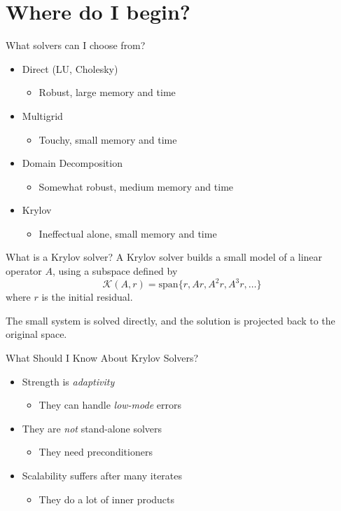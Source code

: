 \documentclass[dvipsnames]{beamer}
\begin{document}
\section{Where do I begin?}
%
\begin{frame}{What solvers can I choose from?}\Large
\begin{itemize}
  \item Direct (LU, Cholesky)
  \begin{itemize}
    \item Robust, large memory and time
  \end{itemize}
  \bigskip
  \item Multigrid
  \begin{itemize}
    \item Touchy, small memory and time
  \end{itemize}
  \bigskip
  \item Domain Decomposition
  \begin{itemize}
    \item Somewhat robust, medium memory and time
  \end{itemize}
  \bigskip
  \item Krylov
  \begin{itemize}
    \item Ineffectual alone, small memory and time
  \end{itemize}
\end{itemize}
\end{frame}
%
\begin{frame}{What is a Krylov solver?}\Large
A Krylov solver builds a small model of a linear operator $A$, using a subspace defined by
\begin{equation*}
  \mathcal{K}(A,r) = \mathrm{span}\{r, Ar, A^2r, A^3r, \ldots \}
\end{equation*}
where $r$ is the initial residual.
\bigskip

\pause
The small system is solved directly, and the solution is projected back to the original space.
\end{frame}
%
\begin{frame}{What Should I Know About Krylov Solvers?}
\LARGE
\begin{itemize}
  \item Strength is \textit{adaptivity}
  \begin{itemize}
    \item They can handle \textit{low-mode} errors
  \end{itemize}
  \bigskip
  \item They are \textit{not} stand-alone solvers
  \begin{itemize}
    \item They need preconditioners
  \end{itemize}
  \bigskip
  \item Scalability suffers after many iterates
  \begin{itemize}
    \item They do a lot of inner products
  \end{itemize}
\end{itemize}
\end{frame}
\end{document}
